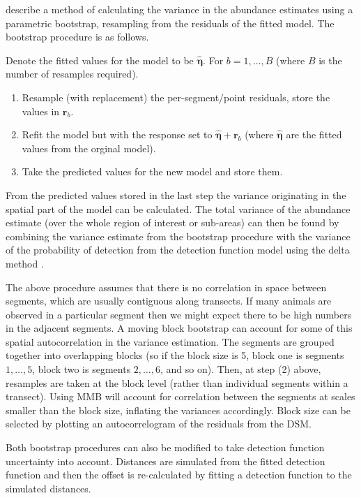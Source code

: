 \documentclass[a4paper,12pt]{article}
\begin{document}
\cite{Hedley:2004et} describe a method of calculating the variance in the abundance estimates using a parametric bootstrap, resampling from the residuals of the fitted model. The bootstrap procedure is as follows.

Denote the fitted values for the model to be $\hat{\bm{\eta}}$. For $b=1,\ldots,B$ (where $B$ is the number of resamples required).
\begin{enumerate}
	\item Resample (with replacement) the per-segment/point residuals, store the values in $\mathbf{r}_{b}$.
	\item Refit the model but with the response set to $\hat{\bm{\eta}}+\mathbf{r}_{b}$ (where $\hat{\bm{\eta}}$ are the fitted values from the orginal model).
	\item Take the predicted values for the new model and store them.
\end{enumerate}
From the predicted values stored in the last step the variance originating in the spatial part of the model can be calculated. The total variance of the abundance estimate (over the whole region of interest or sub-areas) can then be found by combining the variance estimate from the bootstrap procedure with the variance of the probability of detection from the detection function model using the delta method \citep[which assumes that the two components of the variance are independent;][]{verhoef:2012}.

The above procedure assumes that there is no correlation in space between segments, which are usually contiguous along transects. If many animals are observed in a particular segment then we might expect there to be high numbers in the adjacent segments. A moving block bootstrap \citep[MBB;][Section 8.6]{Efron:1993tv} can account for some of this spatial autocorrelation in the variance estimation. The segments are grouped together into overlapping blocks (so if the block size is 5, block one is segments $1,\ldots,5$, block two is segments $2,\ldots,6$, and so on). Then, at step (2) above, resamples are taken at the block level (rather than individual segments within a transect). Using MMB will account for correlation between the segments at scales smaller than the block size, inflating the variances accordingly. Block size can be selected by plotting an autocorrelogram of the residuals from the DSM.

Both bootstrap procedures can also be modified to take detection function uncertainty into account. Distances are simulated from the fitted detection function and then the offset is re-calculated by fitting a detection function to the simulated distances.
 
\end{document}
